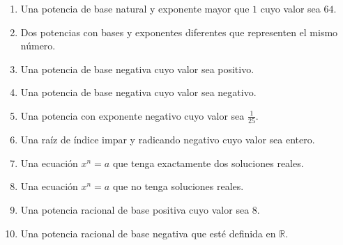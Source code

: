 \begin{enumerate}
\item Una potencia de base natural y exponente mayor que \(1\) cuyo valor sea \(64\).
\item Dos potencias con bases y exponentes diferentes que representen el mismo número.
\item Una potencia de base negativa cuyo valor sea positivo.
\item Una potencia de base negativa cuyo valor sea negativo.
\item Una potencia con exponente negativo cuyo valor sea \(\frac1{25}\).
\item Una raíz de índice impar y radicando negativo cuyo valor sea entero.
\item Una ecuación \(x^n=a\) que tenga exactamente dos soluciones reales.
\item Una ecuación \(x^n=a\) que no tenga soluciones reales.
\item Una potencia racional de base positiva cuyo valor sea \(8\).
\item Una potencia racional de base negativa que esté definida en \(\mathbb R\).
\end{enumerate}
